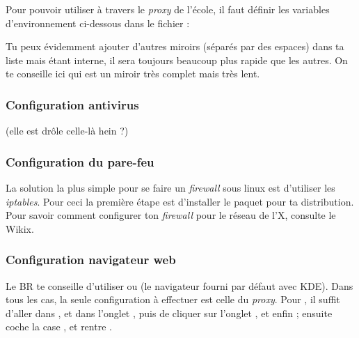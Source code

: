 \label{gentoo_mirror} Pour pouvoir utiliser  à travers le \emph{proxy} de l'école, il faut définir les variables d'environnement
ci-dessous dans le fichier  :

Tu peux évidemment ajouter d'autres miroirs (séparés par des espaces) dans ta liste mais
 étant interne, il sera toujours beaucoup plus rapide que les autres. On te
conseille ici  qui est un miroir très complet mais très lent.



\subsubsection{Configuration antivirus}
\footnotesize{(elle est drôle celle-là hein ?)}

\subsubsection{Configuration du pare-feu}

La solution la plus simple pour se faire un \emph{firewall} sous linux est d'utiliser les \emph{iptables}. Pour ceci la première étape est
d'installer le paquet  pour ta distribution. Pour savoir comment configurer ton \emph{firewall} pour le réseau de l'X, consulte le Wikix.

\subsubsection{Configuration navigateur web}

 Le BR te conseille d'utiliser  ou
 (le navigateur fourni par défaut avec KDE). Dans tous les cas, la seule
configuration à effectuer est celle du \emph{proxy}. Pour , il suffit d'aller dans
,  et dans l'onglet , puis de cliquer sur l'onglet
, et enfin  ; ensuite coche la case , et rentre .

